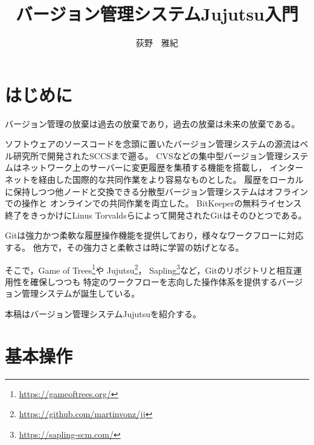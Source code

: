 \documentclass[b5j,twocolumn]{ltjsarticle}
\title{バージョン管理システムJujutsu入門}
\author{荻野　雅紀}
\date{}
\begin{document}
\pagestyle{empty}
\maketitle

\section{はじめに}

バージョン管理の放棄は過去の放棄であり，過去の放棄は未来の放棄である。

ソフトウェアのソースコードを念頭に置いたバージョン管理システムの源流はベル研究所で開発されたSCCSまで遡る。
CVSなどの集中型バージョン管理システムはネットワーク上のサーバーに変更履歴を集積する機能を搭載し，
インターネットを経由した国際的な共同作業をより容易なものとした。
履歴をローカルに保持しつつ他ノードと交換できる分散型バージョン管理システムはオフラインでの操作と
オンラインでの共同作業を両立した。
BitKeeperの無料ライセンス終了をきっかけにLinus Torvaldsらによって開発されたGitはそのひとつである。

Gitは強力かつ柔軟な履歴操作機能を提供しており，様々なワークフローに対応する。
他方で，その強力さと柔軟さは時に学習の妨げとなる。

そこで，Game of Trees\footnote{\url{https://gameoftrees.org/}}や
Jujutsu\footnote{\url{https://github.com/martinvonz/jj}}，
Sapling\footnote{\url{https://sapling-scm.com/}}など，Gitのリポジトリと相互運用性を確保しつつも
特定のワークフローを志向した操作体系を提供するバージョン管理システムが誕生している。

本稿はバージョン管理システムJujutsuを紹介する。

\newpage

\section{基本操作}
\end{document}
